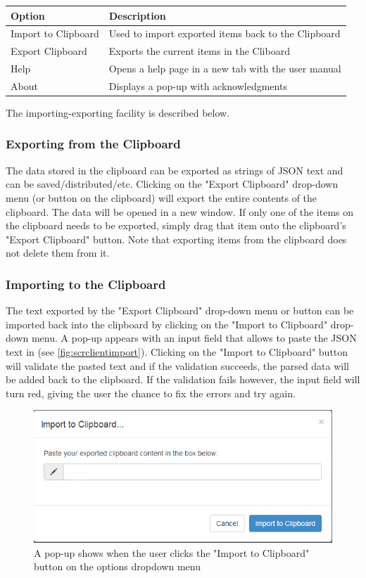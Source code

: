 \documentclass[11pt,twoside,a4paper]{report}
\begin{document}
\begin{tabular}[htp]{|l|l|}
\hline
Option & Description\\
\hline
Import to Clipboard & Used to import exported items back to the Clipboard \\
\hline
Export Clipboard & Exports the current items in the Cliboard\\
\hline
Help & Opens a help page in a new tab with the user manual\\
\hline
About & Displays a pop-up with acknowledgments\\
\hline
\end{tabular}

The importing-exporting facility is described below.

\subsubsection{Exporting from the Clipboard}
The data stored in the clipboard can be exported as strings of JSON text and can be saved/distributed/etc. Clicking on the "Export Clipboard" drop-down menu (or button on the clipboard) will export the entire contents of the clipboard. The data will be opened in a new window. If only one of the items on the clipboard needs to be exported, simply drag that item onto the clipboard's "Export Clipboard" button. Note that exporting items from the clipboard does not delete them from it.

\subsubsection{Importing to the Clipboard}
The text exported by the "Export Clipboard" drop-down menu or button can be imported back into the clipboard by clicking on the "Import to Clipboard" drop-down menu. A pop-up appears with an input field that allows to paste the JSON text in (see \autoref{fig:scrclientimport}). Clicking on the "Import to Clipboard" button will validate the pasted text and if the validation succeeds, the parsed data will be added back to the clipboard. If the validation fails however, the input field will turn red, giving the user the chance to fix the errors and try again.

\begin{figure}[htp]
\centerline{\includegraphics[scale=0.6]{img/scr-client-import.png}}
\caption{A pop-up shows when the user clicks the "Import to Clipboard" button on the options dropdown menu\label{fig:scrclientimport}}
\end{figure}
\end{document}
